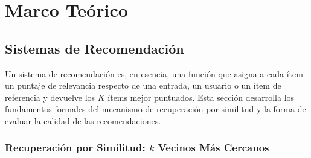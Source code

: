 \chapter{Marco Teórico}
\label{ch:marco-teorico}

%
%
%

\section{Sistemas de Recomendación}
\label{sec:sistemas-recomendacion}

Un sistema de recomendación es, en esencia, una función que asigna a cada ítem un puntaje de relevancia respecto de una entrada, un usuario o un ítem de referencia y devuelve los $K$ ítems mejor puntuados. Esta sección desarrolla los fundamentos formales del mecanismo de recuperación por similitud y la forma de evaluar la calidad de las recomendaciones.

\subsection{Recuperación por Similitud: $k$ Vecinos Más Cercanos}
\label{subsec:knn-recuperacion}

